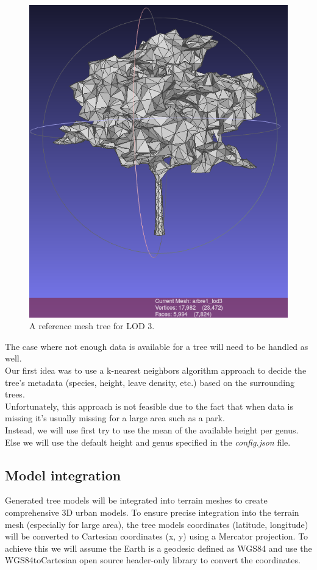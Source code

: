 \documentclass[12pt]{article}
\begin{document}
\begin{figure}[H]
\begin{minipage}{0.45\textwidth}
        \includegraphics[width=\textwidth]{images/lod3.png}
        \caption{A reference mesh tree for LOD 3.}
    \end{minipage}
\end{figure}

The case where not enough data is available for a tree will need to be handled
as well. \\
Our first idea was to use a k-nearest neighbors algorithm \cite{k-NN} approach to
decide the tree's metadata (species, height, leave density, etc.) based on the
surrounding trees. \\
Unfortunately, this approach is not feasible due to the fact that
when data is missing it's usually missing for a large area such as a park. \\
Instead, we will use first try to use the mean of the available height per genus. \\
Else we will use the default height and genus specified in the \textit{config.json} file.

\subsection{Model integration}
Generated tree models will be integrated into terrain meshes to create comprehensive
3D urban models. To ensure precise integration into the terrain mesh (especially for large area), the tree models coordinates
(latitude, longitude) will be converted to Cartesian coordinates (x, y) using
a Mercator projection\cite{mercator-proj}. To achieve this we will assume the Earth is a geodesic
defined as WGS84 \cite{wgs84} and use the WGS84toCartesian\cite{wgs84_to_cartesian} open source header-only
  library to convert the coordinates.
\end{document}
